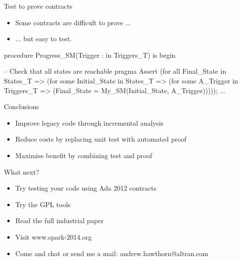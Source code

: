 \documentclass{beamer}
\begin{document}
\begin{frame}[fragile]{Test to prove contracts}
  \begin{itemize}
     \item Some contracts are difficult to prove ...
     \item ... but easy to test.
  \end{itemize}

  \begin{pxcode}[language=SPARK,style=magic,gobble=3]
   procedure Progress_SM(Trigger : in Triggers_T)
   is
   begin

      -- Check that all states are reachable
      pragma Assert
        (for all Final_State in States_T =>
           (for some Initial_State in States_T =>
                (for some A_Trigger in Triggers_T =>
                     (Final_State = My_SM(Initial_State, A_Trigger)))));
   ...
  \end{pxcode}

\end{frame}

\begin{frame}[fragile]{Conclusions}
  \begin{itemize}
     \item Improve legacy code through incremental analysis
     \item Reduce costs by replacing unit test with automated proof
     \item Maximise benefit by combining test and proof
  \end{itemize}
\end{frame}

\begin{frame}[fragile]{What next?}
  \begin{itemize}
     \item Try testing your code using Ada 2012 contracts
     \item Try the GPL tools
     \item Read the full industrial paper
     \item Visit www.spark-2014.org
     \item Come and chat or send me a mail: andrew.hawthorn@altran.com
  \end{itemize}
\end{frame}
\end{document}

